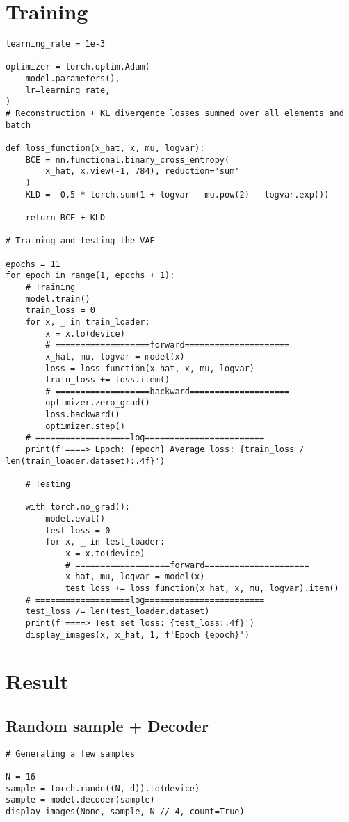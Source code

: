 \section{Training}
\begin{verbatim}
learning_rate = 1e-3

optimizer = torch.optim.Adam(
    model.parameters(),
    lr=learning_rate,
)
# Reconstruction + KL divergence losses summed over all elements and batch

def loss_function(x_hat, x, mu, logvar):
    BCE = nn.functional.binary_cross_entropy(
        x_hat, x.view(-1, 784), reduction='sum'
    )
    KLD = -0.5 * torch.sum(1 + logvar - mu.pow(2) - logvar.exp())

    return BCE + KLD
    
# Training and testing the VAE

epochs = 11
for epoch in range(1, epochs + 1):
    # Training
    model.train()
    train_loss = 0
    for x, _ in train_loader:
        x = x.to(device)
        # ===================forward=====================
        x_hat, mu, logvar = model(x)
        loss = loss_function(x_hat, x, mu, logvar)
        train_loss += loss.item()
        # ===================backward====================
        optimizer.zero_grad()
        loss.backward()
        optimizer.step()
    # ===================log========================
    print(f'====> Epoch: {epoch} Average loss: {train_loss / len(train_loader.dataset):.4f}')
    
    # Testing
    
    with torch.no_grad():
        model.eval()
        test_loss = 0
        for x, _ in test_loader:
            x = x.to(device)
            # ===================forward=====================
            x_hat, mu, logvar = model(x)
            test_loss += loss_function(x_hat, x, mu, logvar).item()
    # ===================log========================
    test_loss /= len(test_loader.dataset)
    print(f'====> Test set loss: {test_loss:.4f}')
    display_images(x, x_hat, 1, f'Epoch {epoch}')
\end{verbatim}

\section{Result}
\subsection{Random sample + Decoder}
\begin{verbatim}
# Generating a few samples

N = 16
sample = torch.randn((N, d)).to(device)
sample = model.decoder(sample)
display_images(None, sample, N // 4, count=True)
\end{verbatim}


